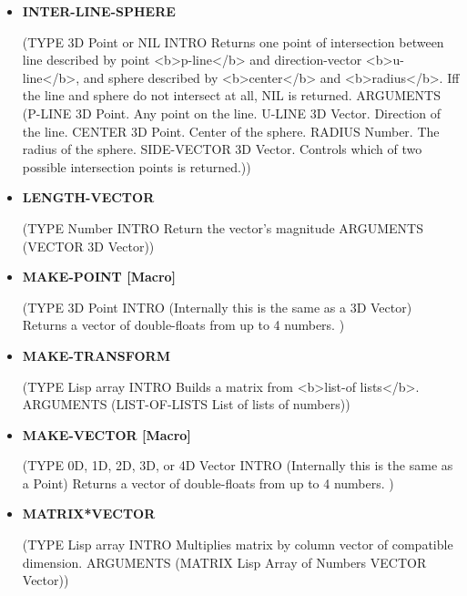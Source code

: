 \documentclass [11pt]{book}
\begin{document}
\begin{itemize}
\item {}
\label{prim:inter-line-sphere}
\textbf{INTER-LINE-SPHERE}

(TYPE 3D Point or NIL INTRO  Returns one point of intersection between line described by
point <b>p-line</b> and direction-vector <b>u-line</b>, and sphere described by
<b>center</b> and <b>radius</b>. Iff the line and sphere do not intersect at
all, NIL is returned.
 ARGUMENTS (P-LINE 3D Point. Any point on the line. U-LINE 3D Vector. Direction of the line. CENTER 3D Point. Center of the sphere. RADIUS Number. The radius of the sphere. SIDE-VECTOR 3D Vector. Controls which of two possible intersection points is returned.))



\item {}
\label{prim:length-vector}
\textbf{LENGTH-VECTOR}

(TYPE Number INTRO  Return the vector's magnitude
 ARGUMENTS (VECTOR 3D Vector))



\item {}
\label{prim:make-point}
\textbf{MAKE-POINT [Macro]}

(TYPE 3D Point INTRO  (Internally this is the same as a 3D Vector) Returns a vector of double-floats from up to 4 numbers.
)



\item {}
\label{prim:make-transform}
\textbf{MAKE-TRANSFORM}

(TYPE Lisp array INTRO  Builds a matrix from <b>list-of lists</b>.
 ARGUMENTS (LIST-OF-LISTS List of lists of numbers))



\item {}
\label{prim:make-vector}
\textbf{MAKE-VECTOR [Macro]}

(TYPE 0D, 1D, 2D, 3D, or 4D Vector INTRO  (Internally this is the same as a Point)
Returns a vector of double-floats from up to 4 numbers.
)



\item {}
\label{prim:matrix*vector}
\textbf{MATRIX*VECTOR}

(TYPE Lisp array INTRO  Multiplies matrix by column vector of compatible dimension.
 ARGUMENTS (MATRIX Lisp Array of Numbers VECTOR Vector))




\end{itemize}
\end{document}
